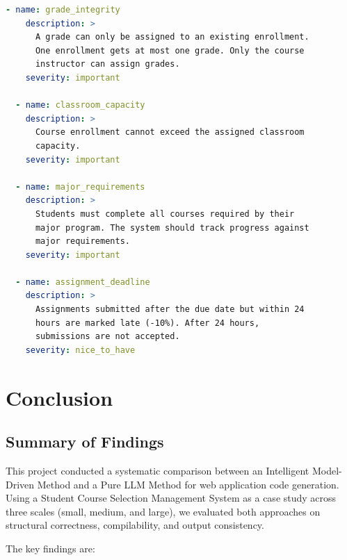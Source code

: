 \documentclass[11pt,a4paper]{article}
\begin{document}
{{\begin{lstlisting}[language=yaml, caption={Complete large model definition (entities excerpt)}]
  - name: grade_integrity
    description: >
      A grade can only be assigned to an existing enrollment.
      One enrollment gets at most one grade. Only the course
      instructor can assign grades.
    severity: important

  - name: classroom_capacity
    description: >
      Course enrollment cannot exceed the assigned classroom
      capacity.
    severity: important

  - name: major_requirements
    description: >
      Students must complete all courses required by their
      major program. The system should track progress against
      major requirements.
    severity: important

  - name: assignment_deadline
    description: >
      Assignments submitted after the due date but within 24
      hours are marked late (-10%). After 24 hours,
      submissions are not accepted.
    severity: nice_to_have
\end{lstlisting}

\newpage
\section{Conclusion}
\label{sec:conclusion}

\subsection{Summary of Findings}

This project conducted a systematic comparison between an Intelligent Model-Driven Method and a Pure LLM Method for web application code generation. Using a Student Course Selection Management System as a case study across three scales (small, medium, and large), we evaluated both approaches on structural correctness, compilability, and output consistency.

The key findings are:

}}
\end{document}
